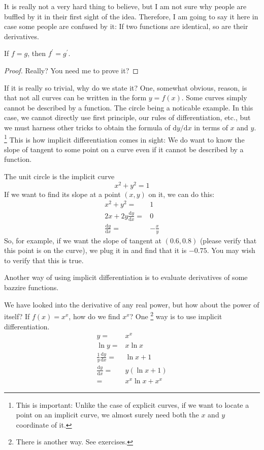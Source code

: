 It is really not a very hard thing to believe, but I am not sure why people are buffled by it in their first sight of the idea.
Therefore, I am going to say it here in case some people are confused by it:
If two functions are identical, so are their derivatives.
\begin{theorem}
    If $f=g$, then $f^\prime=g^\prime$.
\end{theorem}
\begin{proof}
    Really? You need me to prove it?
\end{proof}
If it is really so trivial, why do we state it?
One, somewhat obvious, reason, is that not all curves can be written in the form $y=f(x)$.
Some curves simply cannot be described by a function.
The circle being a noticable example.
In this case, we cannot directly use first principle, our rules of differentiation, etc., but we must harness other tricks to obtain the formula of $\mathrm dy/\mathrm dx$ in terms of $x$ and $y$.
\footnote{This is important: Unlike the case of explicit curves, if we want to locate a point on an implicit curve, we almost surely need both the $x$ and $y$ coordinate of it.}
This is how implicit differentiation comes in sight:
We do want to know the slope of tangent to some point on a curve even if it cannot be described by a function.
\begin{example}
    The unit circle is the implicit curve
    $$x^2+y^2=1$$
    If we want to find its slope at a point $(x,y)$ on it, we can do this:
    \begin{align*}
        x^2+y^2=&1\\
        2x+2y\frac{\mathrm dy}{\mathrm dx}=&0\\
        \frac{\mathrm dy}{\mathrm dx}=&-\frac{x}{y}
    \end{align*}
    So, for example, if we want the slope of tangent at $(0.6,0.8)$ (please verify that this point is on the curve), we plug it in and find that it is $-0.75$.
    You may wish to verify that this is true.
\end{example}
Another way of using implicit differentiation is to evaluate derivatives of some bazzire functions.
\begin{example}
    We have looked into the derivative of any real power, but how about the power of itself?
    If $f(x)=x^x$, how do we find $x^x$?
    One
    \footnote{There is another way. See exercises.}
    way is to use implicit differentiation.
    \begin{align*}
        y=&x^x\\
        \ln y=&x\ln x\\
        \frac{1}{y}\frac{\mathrm dy}{\mathrm dx}=&\ln x+1\\
        \frac{\mathrm dy}{\mathrm dx}=&y(\ln x+1)\\
        =&x^x\ln x+x^x
    \end{align*}
\end{example}
